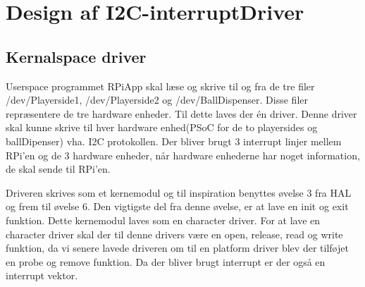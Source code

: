 \documentclass[Softwaredesign/Softwaredesign_main.tex]{subfiles}
\begin{document}
\section{Design af I2C-interruptDriver}\label{sec:I2C_interruptDriver_design_bilag}
\subsection{Kernalspace driver}
Userspace programmet RPiApp skal læse og skrive til og fra de tre filer /dev/Playerside1, /dev/Playerside2 og /dev/BallDispenser. Disse filer repræsentere de tre hardware enheder. Til dette laves der én driver. Denne driver skal kunne skrive til hver hardware enhed(PSoC for de to playersides og ballDipenser) vha. I2C protokollen. Der bliver brugt 3 interrupt linjer mellem RPi'en og de 3 hardware enheder, når hardware enhederne har noget information, de skal sende til RPi'en. 

Driveren skrives som et kernemodul og til inspiration benyttes øvelse 3 fra HAL og frem til øvelse 6. Den vigtigste del fra denne øvelse, er at lave en init og exit funktion. Dette kernemodul laves som en character driver. For at lave en character driver skal der til denne drivers være en open, release, read og write funktion, da vi senere lavede driveren om til en platform driver blev der tilføjet en probe og remove funktion. Da der bliver brugt interrupt er der også en interrupt vektor.
\end{document}
